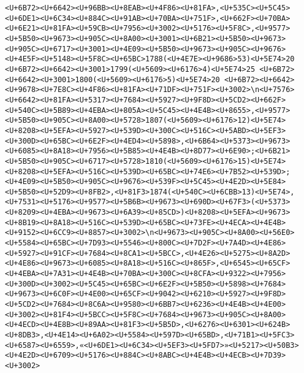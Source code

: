 \documentclass[
]{article}
\begin{document}
\begin{verbatim}
<U+6B72><U+6642><U+96BB><U+8EAB><U+4F86><U+81FA>,<U+535C><U+5C45><U+6DE1><U+6C34><U+884C><U+91AB><U+70BA><U+751F>,<U+662F><U+70BA><U+6E21><U+81FA><U+59CB><U+7956><U+3002><U+5176><U+5F8C>,<U+9577><U+5B50><U+9673><U+905C><U+8A00><U+3001><U+6B21><U+5B50><U+9673><U+905C><U+6717><U+3001><U+4E09><U+5B50><U+9673><U+905C><U+9676><U+4E5F><U+5148><U+5F8C><U+65BC>1788(<U+4E7E><U+9686>53)<U+5E74>20 <U+6B72><U+6642><U+3001>1799(<U+5609><U+6176>4)<U+5E74>25 <U+6B72><U+6642><U+3001>1800(<U+5609><U+6176>5)<U+5E74>20 <U+6B72><U+6642><U+9678><U+7E8C><U+4F86><U+81FA><U+71DF><U+751F><U+3002>\n<U+7576><U+6642><U+81FA><U+5317><U+7684><U+5927><U+9F8D><U+5CD2><U+662F><U+540C><U+5B89><U+4EBA><U+805A><U+5C45><U+4E4B><U+8655>,<U+9577><U+5B50><U+905C><U+8A00><U+5728>1807(<U+5609><U+6176>12)<U+5E74><U+8208><U+5EFA><U+5927><U+539D><U+300C><U+516C><U+5ABD><U+5EF3><U+300D><U+65BC><U+6E2F><U+4ED4><U+5898>,<U+6B64><U+5373><U+9673><U+6085><U+8A18><U+7956><U+5B85><U+4E4B><U+8D77><U+6E90>;<U+6B21><U+5B50><U+905C><U+6717><U+5728>1810(<U+5609><U+6176>15)<U+5E74><U+8208><U+5EFA><U+516C><U+539D><U+65BC><U+74E6><U+7B52><U+539D>;<U+4E09><U+5B50><U+905C><U+9676><U+539F><U+5C45><U+4E2D><U+5E84><U+5B50><U+52D9><U+8FB2>,<U+81F3>1874(<U+540C><U+6CBB>13)<U+5E74>,<U+7531><U+5176><U+9577><U+5B6B><U+9673><U+690D><U+67F3>(<U+5373><U+8209><U+4EBA><U+9673><U+6A39><U+85CD>)<U+8208><U+5EFA><U+9673><U+8B19><U+8A18><U+516C><U+539D><U+65BC><U+73FE><U+4ECA><U+4E4B><U+9152><U+6CC9><U+8857><U+3002>\n<U+9673><U+905C><U+8A00><U+56E0><U+5584><U+65BC><U+7D93><U+5546><U+800C><U+7D2F><U+7A4D><U+4E86><U+5927><U+91CF><U+7684><U+8CA1><U+5BCC>,<U+4E26><U+5275><U+8A2D><U+4E86><U+9673><U+6085><U+8A18><U+516C><U+865F>,<U+6545><U+65CF><U+4EBA><U+7A31><U+4E4B><U+70BA><U+300C><U+8CFA><U+9322><U+7956><U+300D><U+3002><U+5C45><U+65BC><U+6E2F><U+5B50><U+5898><U+7684><U+9673><U+6C0F><U+4E00><U+65CF><U+9042><U+6210><U+5927><U+9F8D><U+5CD2><U+7684><U+8C6A><U+9580><U+6BB7><U+6236><U+4E4B><U+4E00><U+3002><U+81F4><U+5BCC><U+5F8C><U+7684><U+9673><U+905C><U+8A00><U+4ECD><U+4E8B><U+89AA><U+81F3><U+5B5D>,<U+6276><U+6301><U+624B><U+8DB3>,<U+4E14><U+6A02><U+5584><U+597D><U+65BD>,<U+71B1><U+5FC3><U+6587><U+6559>,«<U+6DE1><U+6C34><U+5EF3><U+5FD7>»<U+5217><U+50B3><U+4E2D><U+6709><U+5176><U+884C><U+8ABC><U+4E4B><U+4ECB><U+7D39><U+3002>

\end{verbatim}
\end{document}
